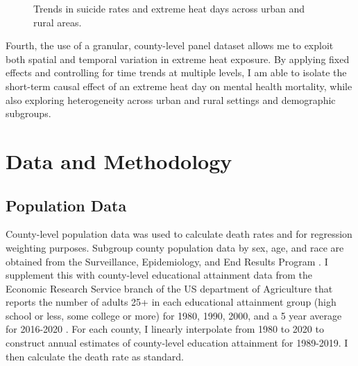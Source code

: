 \documentclass[12pt, a4paper]{article}
\begin{document}
\begin{figure}[H]
    \caption{Trends in suicide rates and extreme heat days across urban and rural areas.}
    \label{fig:trends}
\end{figure}

Fourth, the use of a granular, county-level panel dataset allows me to exploit both spatial and temporal variation in extreme heat exposure. By applying fixed effects and controlling for time trends at multiple levels, I am able to isolate the short-term causal effect of an extreme heat day on mental health mortality, while also exploring heterogeneity across urban and rural settings and demographic subgroups.

\section{Data and Methodology}
\subsection{Population Data}
County-level population data was used to calculate death rates and for regression weighting purposes. Subgroup county population data by sex, age, and race are obtained from the Surveillance, Epidemiology, and End Results Program \cite{seerPop2022}. I supplement this with county-level educational attainment data from the Economic Research Service branch of the US department of Agriculture that reports the number of adults 25+ in each educational attainment group (high school or less, some college or more) for 1980, 1990, 2000, and a 5 year average for 2016-2020 \cite{ersEducation2022}. For each county, I linearly interpolate from 1980 to 2020 to construct annual estimates of county-level education attainment for 1989-2019. I then calculate the death rate as standard.
\end{document}
